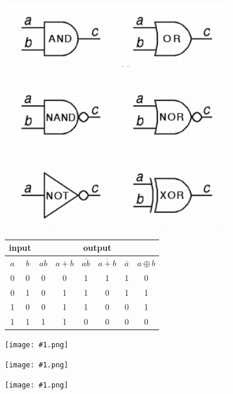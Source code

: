 \documentclass[10pt,a4paper]{article}
\def\img#1#2{\begin{tcolorbox}[title=#2]\texttt{[image: \#1.png]}\end{tcolorbox}}
\begin{document}
\begin{CJK}{UTF8}{gbsn}
\begin{twocolumn}
\begin{tcolorbox}[title=逻辑门电路]
			\centering
			\includegraphics[width=0.75\textwidth]{CMOS.png}
			\begin{tabular}{|c|c|c|c|c|c|c|c|}
				\hline
				\multicolumn{2}{|c|}{input} & \multicolumn{6}{c|}{output} \\
				\hline
				$ a $ & $ b $  & $ ab $ & $ a+b $ & $ \overline{ab} $ & $ \overline{a+b} $& $\overline{a}$ & $a\oplus b$ \\
				\hline
				0 & 0 & 0 & 0 & 1 & 1 & 1 & 0 \\
				\hline
				0 & 1 & 0 & 1 & 1 & 0 & 1 & 1 \\
				\hline
				1 & 0 & 0 & 1 & 1 & 0 & 0 & 1 \\
				\hline
				1 & 1 & 1 & 1 & 0 & 0 & 0 & 0 \\
				\hline
			\end{tabular}
		\end{tcolorbox}
		\begin{tcolorbox}[title=锁存器和数据传输器]
			\img{latch}{74LS373 D Latch}
			\img{dt}{Data Bus Transceiver}
		\end{tcolorbox}
		\img{buscycle}{8086/88 总线周期}
	\end{twocolumn}
	\end{CJK}
\end{document}
